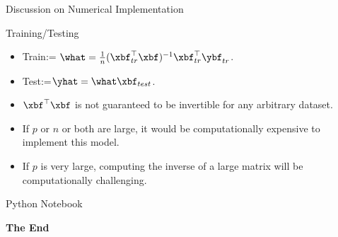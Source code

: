 \documentclass[aspectratio=169,xcolor=dvipsnames,svgnames,x11names,fleqn]{beamer}
\begin{document}
\begin{frame}{Discussion on Numerical Implementation}

    \begin{facts}{Training/Testing}
    \begin{itemize}
        \item Train:= $\what = \tfrac{1}{n}(\xbf_{tr}^\top \xbf)^{-1} \xbf_{tr}^\top \ybf_{tr}$.
        \item Test:=$ \yhat =\what \xbf_{test}$.
        \item $\xbf^\top \xbf$ is not guaranteed to be invertible for any arbitrary dataset.
        \item If $p$ or $n$ or both are large, it would be computationally expensive to implement this model.
        \item If $p$ is very large, computing the inverse of a large matrix will be computationally challenging.
    \end{itemize}
    \end{facts}
    
    \end{frame}
    
    
    
    \begin{frame}[containsverbatim]{Python Notebook}
    \begin{center}
    \small
    { }
    \end{center}
    \end{frame}
    
    
    \begin{frame}
        \Huge{\centerline{\color{MediumBlue}\textbf{The End}}}
    \end{frame}
\end{document}
